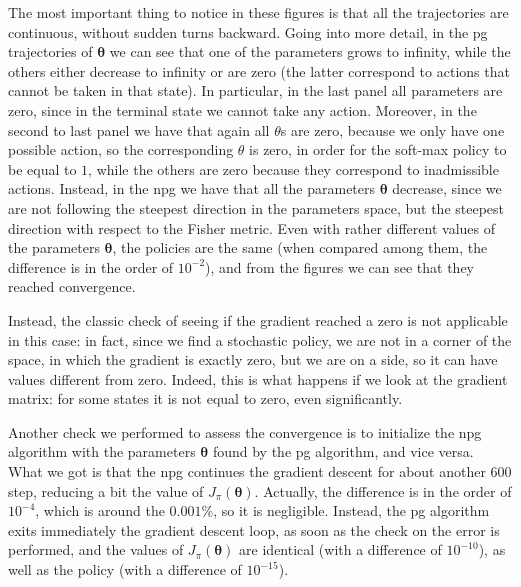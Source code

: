 The most important thing to notice in these figures is that all the trajectories are continuous, without sudden turns backward. Going into more detail, in the \acrshort{pg} trajectories of $\boldsymbol \theta$ we can see that one of the parameters grows to infinity, while the others either decrease to infinity or are zero (the latter correspond to actions that cannot be taken in that state). In particular, in the last panel all parameters are zero, since in the terminal state we cannot take any action. Moreover, in the second to last panel we have that again all $\theta$s are zero, because we only have one possible action, so the corresponding $\theta$ is zero, in order for the soft-max policy to be equal to $1$, while the others are zero because they correspond to inadmissible actions. Instead, in the \acrshort{npg} we have that all the parameters $\boldsymbol \theta$ decrease, since we are not following the steepest direction in the parameters space, but the steepest direction with respect to the Fisher metric. Even with rather different values of the parameters $\boldsymbol \theta$, the policies are the same (when compared among them, the difference is in the order of $10^{-2}$), and from the figures we can see that they reached convergence.

Instead, the classic check of seeing if the gradient reached a zero is not applicable in this case: in fact, since we find a stochastic policy, we are not in a corner of the space, in which the gradient is exactly zero, but we are on a side, so it can have values different from zero. Indeed, this is what happens if we look at the gradient matrix: for some states it is not equal to zero, even significantly.

Another check we performed to assess the convergence is to initialize the \acrshort{npg} algorithm with the parameters $\boldsymbol \theta$ found by the \acrshort{pg} algorithm, and vice versa. What we got is that the \acrshort{npg} continues the gradient descent for about another $600$ step, reducing a bit the value of $J_\pi(\boldsymbol \theta)$. Actually, the difference is in the order of $10^{-4}$, which is around the $0.001\%$, so it is negligible. Instead, the \acrshort{pg} algorithm exits immediately the gradient descent loop, as soon as the check on the error is performed, and the values of $J_\pi(\boldsymbol \theta)$ are identical (with a difference of $10^{-10}$), as well as the policy (with a difference of $10^{-15}$).

